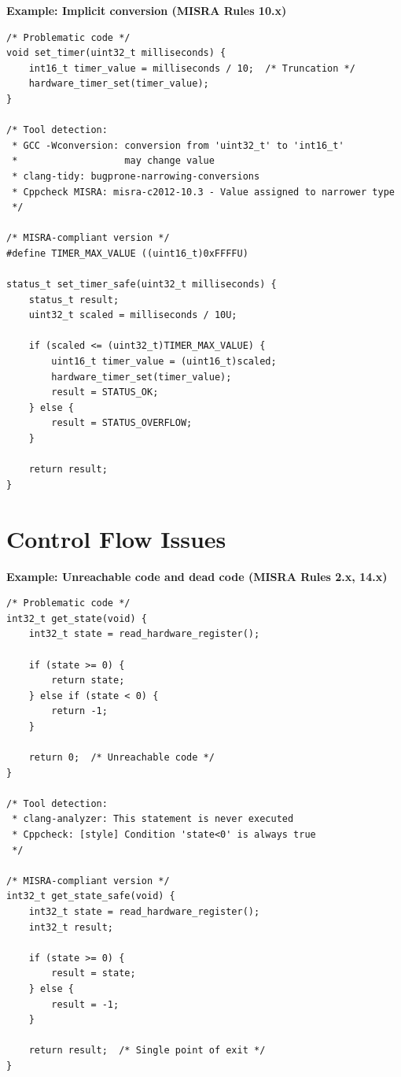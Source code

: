 \documentclass[11pt,letterpaper]{report}
\begin{document}
\textbf{Example: Implicit conversion (MISRA Rules 10.x)}

\begin{verbatim}
/* Problematic code */
void set_timer(uint32_t milliseconds) {
    int16_t timer_value = milliseconds / 10;  /* Truncation */
    hardware_timer_set(timer_value);
}

/* Tool detection:
 * GCC -Wconversion: conversion from 'uint32_t' to 'int16_t'
 *                   may change value
 * clang-tidy: bugprone-narrowing-conversions
 * Cppcheck MISRA: misra-c2012-10.3 - Value assigned to narrower type
 */

/* MISRA-compliant version */
#define TIMER_MAX_VALUE ((uint16_t)0xFFFFU)

status_t set_timer_safe(uint32_t milliseconds) {
    status_t result;
    uint32_t scaled = milliseconds / 10U;

    if (scaled <= (uint32_t)TIMER_MAX_VALUE) {
        uint16_t timer_value = (uint16_t)scaled;
        hardware_timer_set(timer_value);
        result = STATUS_OK;
    } else {
        result = STATUS_OVERFLOW;
    }

    return result;
}
\end{verbatim}

\section{Control Flow Issues}

\textbf{Example: Unreachable code and dead code (MISRA Rules 2.x, 14.x)}

\begin{verbatim}
/* Problematic code */
int32_t get_state(void) {
    int32_t state = read_hardware_register();

    if (state >= 0) {
        return state;
    } else if (state < 0) {
        return -1;
    }

    return 0;  /* Unreachable code */
}

/* Tool detection:
 * clang-analyzer: This statement is never executed
 * Cppcheck: [style] Condition 'state<0' is always true
 */

/* MISRA-compliant version */
int32_t get_state_safe(void) {
    int32_t state = read_hardware_register();
    int32_t result;

    if (state >= 0) {
        result = state;
    } else {
        result = -1;
    }

    return result;  /* Single point of exit */
}
\end{verbatim}
\end{document}
